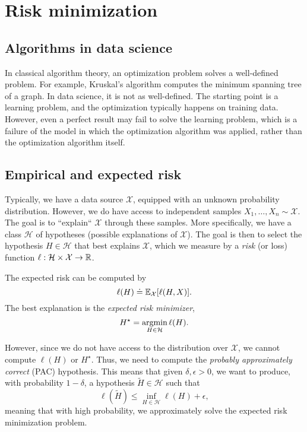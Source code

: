 \section{Risk minimization}

\subsection{Algorithms in data science}

In classical algorithm theory, an optimization problem solves a well-defined problem. For example,
Kruskal's algorithm computes the minimum spanning tree of a graph. In data science, it is not as
well-defined. The starting point is a learning problem, and the optimization typically happens on
training data. However, even a perfect result may fail to solve the learning problem, which is a
failure of the model in which the optimization algorithm was applied, rather than the optimization
algorithm itself.

\subsection{Empirical and expected risk}

Typically, we have a data source $\mathcal{X}$, equipped with an unknown probability distribution.
However, we do have access to independent samples $X_1,\ldots,X_n \sim \mathcal{X}$. The goal is to
``explain`` $\mathcal{X}$ through these samples. More specifically, we have a class $\mathcal{H}$
of hypotheses (possible explanations of $\mathcal{X}$). The goal is then to select the hypothesis
$H\in \mathcal{H}$ that best explains $\mathcal{X}$, which we measure by a \textit{risk} (or loss)
function $\ell: \mathcal{H}\times \mathcal{X}\to \mathbb{R}$.

The expected risk can be computed by \[
    \ell(H) \doteq \mathbb{E}_{\mathcal{X}}[\ell(H, X)].
\]
The best explanation is the \textit{expected risk minimizer}, \[
    H^\star = \operatorname*{argmin}_{H\in \mathcal{H}} \ell(H).
\]

However, since we do not have access to the distribution over $\mathcal{X}$, we cannot compute
$\ell(H)$ or $H^\star$. Thus, we need to compute the \textit{probably approximately correct} (PAC)
hypothesis. This means that given $\delta,\epsilon > 0$, we want to produce, with probability
$1-\delta$, a hypothesis $\tilde{H}\in \mathcal{H}$ such that \[
    \ell(\tilde{H}) \leq \inf_{H\in \mathcal{H}} \ell(H) + \epsilon,
\]
meaning that with high probability, we approximately solve the expected risk minimization problem.

